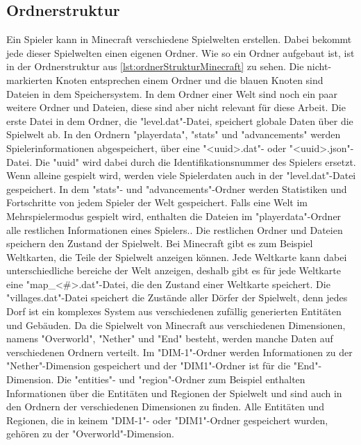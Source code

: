 
\subsection{Ordnerstruktur}
Ein Spieler kann in Minecraft verschiedene Spielwelten erstellen. Dabei bekommt jede dieser Spielwelten einen eigenen Ordner. Wie so ein Ordner aufgebaut ist, ist in der Ordnerstruktur aus \ref{lst:ordnerStrukturMinecraft} zu sehen. Die nicht-markierten Knoten entsprechen einem Ordner und die blauen Knoten sind Dateien in dem Speichersystem. In dem Ordner einer Welt sind noch ein paar weitere Ordner und Dateien, diese sind aber nicht relevant für diese Arbeit. Die erste Datei in dem Ordner, die "level.dat"-Datei, speichert globale Daten über die Spielwelt ab. In den Ordnern "playerdata", "stats" und "advancements" werden Spielerinformationen abgespeichert, über eine "<uuid>.dat"- oder "<uuid>.json"-Datei. Die "uuid" wird dabei durch die Identifikationsnummer des Spielers ersetzt. Wenn alleine gespielt wird, werden viele Spielerdaten auch in der "level.dat"-Datei gespeichert. In dem "stats"- und "advancements"-Ordner werden Statistiken und Fortschritte von jedem Spieler der Welt gespeichert. Falls eine Welt im Mehrspielermodus gespielt wird, enthalten die Dateien im "playerdata"-Ordner alle restlichen Informationen eines Spielers.\cite{minecraftPlayerdatFormat}. Die restlichen Ordner und Dateien speichern den Zustand der Spielwelt. Bei Minecraft gibt es zum Beispiel Weltkarten, die Teile der Spielwelt anzeigen können. Jede Weltkarte kann dabei unterschiedliche bereiche der Welt anzeigen, deshalb gibt es für jede Weltkarte eine "map\_<\#>.dat"-Datei, die den Zustand einer Weltkarte speichert. Die "villages.dat"-Datei speichert die Zustände aller Dörfer der Spielwelt, denn jedes Dorf ist ein komplexes System aus verschiedenen zufällig generierten Entitäten und Gebäuden. Da die Spielwelt von Minecraft aus verschiedenen Dimensionen, namens "Overworld", "Nether" und "End" besteht, werden manche Daten auf verschiedenen Ordnern verteilt. Im "DIM-1"-Ordner werden Informationen zu der "Nether"-Dimension gespeichert und der "DIM1"-Ordner ist für die "End"-Dimension. Die "entities"- und "region"-Ordner zum Beispiel enthalten Informationen über die Entitäten und Regionen der Spielwelt und sind auch in den Ordnern der verschiedenen Dimensionen zu finden. Alle Entitäten und Regionen, die in keinem "DIM-1"- oder "DIM1"-Ordner gespeichert wurden, gehören zu der "Overworld"-Dimension.\cite{minecraftFolderStruc}

